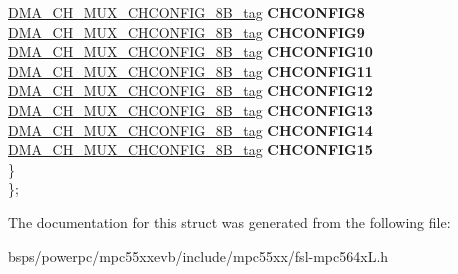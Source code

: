 \begin{DoxyCompactItemize}
\begin{tabbing}
\>\>\mbox{\hyperlink{unionDMA__CH__MUX__CHCONFIG__8B__tag}{DMA\_CH\_MUX\_CHCONFIG\_8B\_tag}} {\bfseries CHCONFIG8}\\
\>\>\mbox{\hyperlink{unionDMA__CH__MUX__CHCONFIG__8B__tag}{DMA\_CH\_MUX\_CHCONFIG\_8B\_tag}} {\bfseries CHCONFIG9}\\
\>\>\mbox{\hyperlink{unionDMA__CH__MUX__CHCONFIG__8B__tag}{DMA\_CH\_MUX\_CHCONFIG\_8B\_tag}} {\bfseries CHCONFIG10}\\
\>\>\mbox{\hyperlink{unionDMA__CH__MUX__CHCONFIG__8B__tag}{DMA\_CH\_MUX\_CHCONFIG\_8B\_tag}} {\bfseries CHCONFIG11}\\
\>\>\mbox{\hyperlink{unionDMA__CH__MUX__CHCONFIG__8B__tag}{DMA\_CH\_MUX\_CHCONFIG\_8B\_tag}} {\bfseries CHCONFIG12}\\
\>\>\mbox{\hyperlink{unionDMA__CH__MUX__CHCONFIG__8B__tag}{DMA\_CH\_MUX\_CHCONFIG\_8B\_tag}} {\bfseries CHCONFIG13}\\
\>\>\mbox{\hyperlink{unionDMA__CH__MUX__CHCONFIG__8B__tag}{DMA\_CH\_MUX\_CHCONFIG\_8B\_tag}} {\bfseries CHCONFIG14}\\
\>\>\mbox{\hyperlink{unionDMA__CH__MUX__CHCONFIG__8B__tag}{DMA\_CH\_MUX\_CHCONFIG\_8B\_tag}} {\bfseries CHCONFIG15}\\
\>\} \\
\}; \\

\end{tabbing}\end{DoxyCompactItemize}


The documentation for this struct was generated from the following file\+:\begin{DoxyCompactItemize}
\item 
bsps/powerpc/mpc55xxevb/include/mpc55xx/fsl-\/mpc564x\+L.\+h\end{DoxyCompactItemize}
